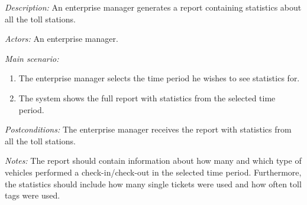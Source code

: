 \textit{Description:} An enterprise manager generates a report containing statistics about all the toll stations.

\textit{Actors:} An enterprise manager.

\textit{Main scenario:}
\begin{enumerate}
\item The enterprise manager selects the time period he wishes to see statistics for.
\item The system shows the full report with statistics from the selected time period.
\end{enumerate}

\textit{Postconditions:}
The enterprise manager receives the report with statistics from all the toll stations.

\textit{Notes:}
The report should contain information about how many and which type of vehicles performed a check-in/check-out in the selected time period. Furthermore, the statistics should include how many single tickets were
used and how often toll tags were used.
